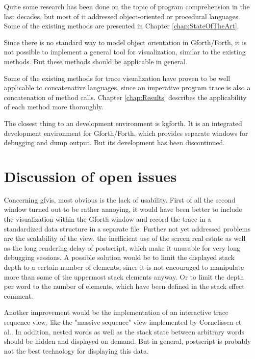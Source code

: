 Quite some research has been done on the topic of program comprehension in the last decades, but most of it addressed object-oriented or procedural languages. Some of the existing methods are presented in Chapter \ref{chap:StateOfTheArt}. 

Since there is no standard way to model object orientation in Gforth/Forth, it is not possible to implement a general tool for visualization, similar to the existing methods. But these methods should be applicable in general.

Some of the existing methods for trace visualization have proven to be well applicable to concatenative languages, since an imperative program trace is also a concatenation of method calls. Chapter \ref{chap:Results} describes the applicability of each method more thoroughly. 

The closest thing to an development environment is kgforth. It is an integrated development environment for Gforth/Forth, which provides separate windows for debugging and dump output. But its development has been discontinued.

\section{Discussion of open issues}

Concerning gfvis, most obvious is the lack of usability. First of all the second window turned out to be rather annoying, it would have been better to include the visualization within the Gforth window and record the trace in a standardized data structure in a separate file.
Further not yet addressed problems are the scalability of the view, the inefficient use of the screen real estate as well as the long rendering delay of postscript, which make it unusable for very long debugging sessions. A possible solution would be to limit the displayed stack depth to a certain number of elements, since it is not encouraged to manipulate more than some of the uppermost stack elements anyway. Or to limit the depth per word to the number of elements, which have been defined in the stack effect comment.

Another improvement would be the implementation of an interactive trace sequence view, like the "massive sequence" view implemented by Cornelissen et al.\cite{Cornelissen:2008:ETA:1454787.1454981}. In addition, nested words as well as the stack state between arbitrary words should be hidden and displayed on demand. But in general, postscript is probably not the best technology for displaying this data.

